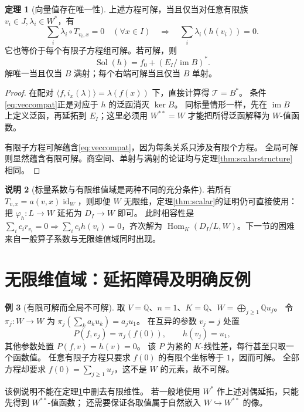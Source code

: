 \documentclass[UTF8,11pt,a4paper]{ctexart}
\theoremstyle{definition}
\newtheorem{theorem}{定理}[section]
\newtheorem{example}[theorem]{例}
\newtheorem{remark}[theorem]{说明}
\newcommand{\Q}{\mathbb Q}
\newcommand{\Hom}{\operatorname{Hom}}
\newcommand{\im}{\operatorname{im}}
\newcommand{\id}{\operatorname{id}}
\newcommand{\T}{\mathcal T}
\newcommand{\Sol}{\operatorname{Sol}}
\numberwithin{equation}{section}
\begin{document}
\begin{theorem}[向量值存在唯一性]\label{thm:vectorfinite}
上述方程可解，当且仅当对任意有限族 $v_i\in J,\lambda_i\in W^*$，有
\begin{equation}\label{eq:veccompat}
 \sum_i\lambda_i\circ T_{v_i,x}=0\quad(\forall x\in I)
 \quad\Longrightarrow\quad
 \sum_i\lambda_i(h(v_i))=0.
\end{equation}
它也等价于每个有限子方程组可解。若可解，则
\[
 \Sol(h)=f_0+(E_I/\im B)^*.
\]
解唯一当且仅当 $B$ 满射；每个右端可解当且仅当 $B$ 单射。
\end{theorem}
\begin{proof}
在配对 $\langle f,i_x(\lambda)\rangle=\lambda(f(x))$ 下，直接计算得 $\T=B^*$。
条件\eqref{eq:veccompat}正是对应于 $h$ 的泛函消灭 $\ker B$。
同标量情形一样，先在 $\im B$ 上定义泛函，再延拓到 $E_I$；这里必须用 $W^{**}=W$ 才能把所得泛函解释为 $W$-值函数。

有限子方程可解蕴含\eqref{eq:veccompat}，因为每条关系只涉及有限个方程。
全局可解则显然蕴含有限可解。商空间、单射与满射的论证均与定理\ref{thm:scalarstructure}相同。
\end{proof}

\begin{remark}[标量系数与有限维值域是两种不同的充分条件]
若所有 $T_{v,x}=a(v,x)\id_W$，则即便 $W$ 无限维，定理\ref{thm:scalar}的证明仍可直接使用：
把 $\varphi_h:L\to W$ 延拓为 $D_I\to W$ 即可。
此时相容性是 $\sum_i c_ir_{v_i}=0\Rightarrow\sum_i c_i h(v_i)=0$，齐次解为
$\Hom_K(D_I/L,W)$。下一节的困难来自一般算子系数与无限维值域同时出现。
\end{remark}

\section{无限维值域：延拓障碍及明确反例}\label{sec:infinite}
\begin{example}[有限可解而全局不可解]\label{ex:infinite}
取 $V=\Q$、$n=1$、$K=\Q$、$W=\bigoplus_{j\ge1}\Q u_j$。
令 $\pi_j:W\to W$ 为 $\pi_j(\sum_k a_ku_k)=a_ju_1$。
在互异的参数 $v_j=j$ 处置
\[
 P(f,v_j)=\pi_j(f(0)),\qquad h(v_j)=u_1,
\]
其他参数处置 $P(f,v)=h(v)=0$。
该 $P$ 为紧的 $K$-线性差，每行甚至只取一个函数值。
任意有限子方程只要求 $f(0)$ 的有限个坐标等于 $1$，因而可解。
全部方程却要求 $f(0)=\sum_{j\ge1}u_j$，这不是 $W$ 的元素，故不可解。
\end{example}
该例说明不能在定理\ref{thm:vectorfinite}中删去有限维性。
若一般地使用 $W^*$ 作上述对偶延拓，只能先得到 $W^{**}$-值函数；
还需要保证各取值属于自然嵌入 $W\hookrightarrow W^{**}$ 的像。
\end{document}
